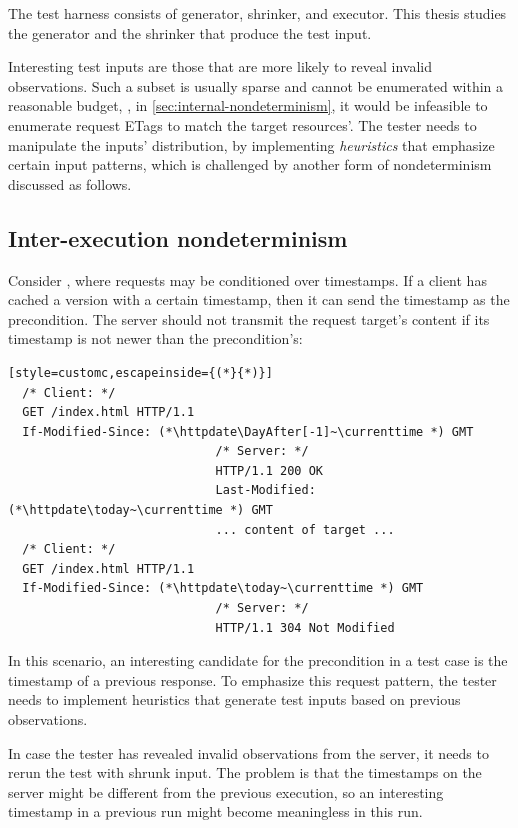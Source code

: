 The test harness consists of generator, shrinker, and executor.  This thesis
studies the generator and the shrinker that produce the test input.

Interesting test inputs are those that are more likely to reveal invalid
observations.  Such a subset is usually sparse and cannot be enumerated within a
reasonable budget, \eg, in \autoref{sec:internal-nondeterminism}, it would be
infeasible to enumerate request ETags to match the target resources'.  The
tester needs to manipulate the inputs' distribution, by implementing {\em
heuristics} that emphasize certain input patterns, which is challenged by
another form of nondeterminism discussed as follows.

\subsection{Inter-execution nondeterminism}
\label{sec:inter-execution}
Consider \http, where requests may be conditioned over timestamps.  If a client
has cached a version with a certain timestamp, then it can send the timestamp as
the  precondition.  The server should not transmit
the request target's content if its  timestamp is not
newer than the precondition's:
\begin{lstlisting}[style=customc,escapeinside={(*}{*)}]
  /* Client: */
  GET /index.html HTTP/1.1
  If-Modified-Since: (*\httpdate\DayAfter[-1]~\currenttime *) GMT
                             /* Server: */
                             HTTP/1.1 200 OK
                             Last-Modified: (*\httpdate\today~\currenttime *) GMT
                             ... content of target ...
  /* Client: */
  GET /index.html HTTP/1.1
  If-Modified-Since: (*\httpdate\today~\currenttime *) GMT
                             /* Server: */
                             HTTP/1.1 304 Not Modified
\end{lstlisting}

In this scenario, an interesting candidate for the 
precondition in a test case is the  timestamp of a
previous response.  To emphasize this request pattern, the tester needs to
implement heuristics that generate test inputs based on previous observations.

In case the tester has revealed invalid observations from the server, it needs
to rerun the test with shrunk input.  The problem is that the timestamps on the
server might be different from the previous execution, so an interesting
timestamp in a previous run might become meaningless in this run.

